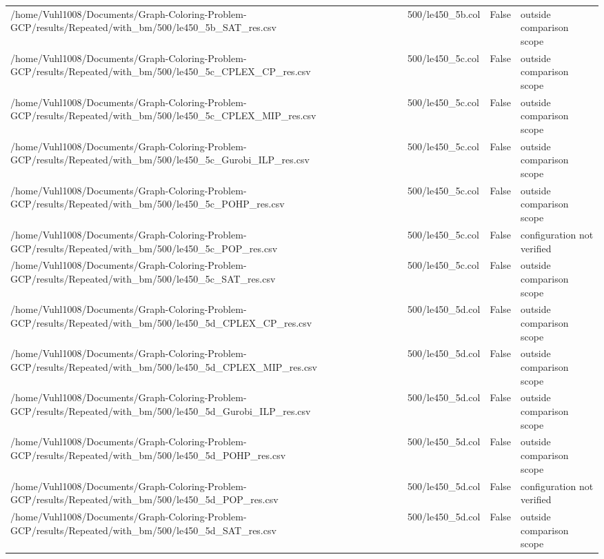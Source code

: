 \begin{table}[htbp]
\begin{tabular}{llll}
/home/Vuhl1008/Documents/Graph-Coloring-Problem-GCP/results/Repeated/with\_bm/500/le450\_5b\_SAT\_res.csv & 500/le450\_5b.col & False & outside comparison scope \\
/home/Vuhl1008/Documents/Graph-Coloring-Problem-GCP/results/Repeated/with\_bm/500/le450\_5c\_CPLEX\_CP\_res.csv & 500/le450\_5c.col & False & outside comparison scope \\
/home/Vuhl1008/Documents/Graph-Coloring-Problem-GCP/results/Repeated/with\_bm/500/le450\_5c\_CPLEX\_MIP\_res.csv & 500/le450\_5c.col & False & outside comparison scope \\
/home/Vuhl1008/Documents/Graph-Coloring-Problem-GCP/results/Repeated/with\_bm/500/le450\_5c\_Gurobi\_ILP\_res.csv & 500/le450\_5c.col & False & outside comparison scope \\
/home/Vuhl1008/Documents/Graph-Coloring-Problem-GCP/results/Repeated/with\_bm/500/le450\_5c\_POHP\_res.csv & 500/le450\_5c.col & False & outside comparison scope \\
/home/Vuhl1008/Documents/Graph-Coloring-Problem-GCP/results/Repeated/with\_bm/500/le450\_5c\_POP\_res.csv & 500/le450\_5c.col & False & configuration not verified \\
/home/Vuhl1008/Documents/Graph-Coloring-Problem-GCP/results/Repeated/with\_bm/500/le450\_5c\_SAT\_res.csv & 500/le450\_5c.col & False & outside comparison scope \\
/home/Vuhl1008/Documents/Graph-Coloring-Problem-GCP/results/Repeated/with\_bm/500/le450\_5d\_CPLEX\_CP\_res.csv & 500/le450\_5d.col & False & outside comparison scope \\
/home/Vuhl1008/Documents/Graph-Coloring-Problem-GCP/results/Repeated/with\_bm/500/le450\_5d\_CPLEX\_MIP\_res.csv & 500/le450\_5d.col & False & outside comparison scope \\
/home/Vuhl1008/Documents/Graph-Coloring-Problem-GCP/results/Repeated/with\_bm/500/le450\_5d\_Gurobi\_ILP\_res.csv & 500/le450\_5d.col & False & outside comparison scope \\
/home/Vuhl1008/Documents/Graph-Coloring-Problem-GCP/results/Repeated/with\_bm/500/le450\_5d\_POHP\_res.csv & 500/le450\_5d.col & False & outside comparison scope \\
/home/Vuhl1008/Documents/Graph-Coloring-Problem-GCP/results/Repeated/with\_bm/500/le450\_5d\_POP\_res.csv & 500/le450\_5d.col & False & configuration not verified \\
/home/Vuhl1008/Documents/Graph-Coloring-Problem-GCP/results/Repeated/with\_bm/500/le450\_5d\_SAT\_res.csv & 500/le450\_5d.col & False & outside comparison scope \\

\end{tabular}
\end{table}
